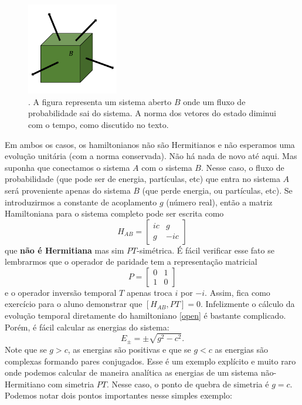 \documentclass{article}
\begin{document}
\begin{figure}[h]
\centering
\includegraphics[width=4cm]{fig3.pdf}
\captionsetup{labelsep=none}
\caption{. A figura representa um sistema aberto $B$ onde um fluxo de probabilidade sai do sistema. A norma dos vetores do estado diminui com o tempo, como discutido no texto. }
\end{figure}
Em ambos os casos, os hamiltonianos não são Hermitianos e não esperamos uma evolução unitária (com a norma conservada). Não há nada de novo até aqui. Mas suponha que conectamos o sistema $A$ com o sistema $B$. Nesse caso, o fluxo de probabilidade (que pode ser de energia, partículas, etc) que entra no sistema $A$ será proveniente apenas do sistema $B$ (que perde energia, ou partículas, etc). Se introduzirmos a constante de acoplamento $g$ (número real), então a matriz Hamiltoniana para o sistema completo pode ser escrita como
\begin{equation}
    H_{AB} = \begin{bmatrix}
    ic & g \\
    g & -ic
\end{bmatrix}
\label{open}
\end{equation}
que \textbf{não é Hermitiana} mas sim $PT$-simétrica. É fácil verificar esse fato se lembrarmos que o operador de paridade tem a representação matricial
\begin{equation}
    P = \begin{bmatrix}
    0 & 1 \\
    1 & 0
\end{bmatrix}
\end{equation}
e o operador inversão temporal $T$ apenas troca $i$ por $-i$. Assim, fica como exercício para o aluno demonstrar que $[H_{AB},PT] = 0$. Infelizmente o cálculo da evolução temporal diretamente do hamiltoniano \eqref{open} é bastante complicado. Porém, é fácil calcular as energias do sistema:
\begin{equation}
    E_{\pm} = \pm \sqrt{g^2 - c^2}.
\end{equation}
Note que se $g > c$, as energias são positivas e que se $g<c$ as energias são complexas formando pares conjugados. Esse é um exemplo explícito e muito raro onde podemos calcular de maneira analítica as energias de um sistema não-Hermitiano com simetria $PT$. Nesse caso, o ponto de quebra de simetria é $g = c$. Podemos notar dois pontos importantes nesse simples exemplo:
\end{document}
